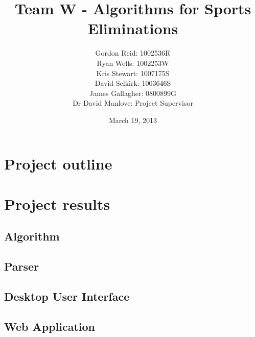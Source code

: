 \documentclass{beamer}
\title{Team W - Algorithms for Sports Eliminations}
\author{
    Gordon Reid: 1002536R\\
    Ryan Wells: 1002253W\\
    Kris Stewart: 1007175S\\
    David Selkirk: 1003646S\\
    James Gallagher: 0800899G\\
    Dr David Manlove: Project Supervisor
}
\date{March 19, 2013}
\begin{document}
\frame{\titlepage}
\frame{\tableofcontents}
\section{Project outline}
\section{Project results}
\subsection{Algorithm}
\subsection{Parser}
\subsection{Desktop User Interface}
\subsection{Web Application}
\end{document}
